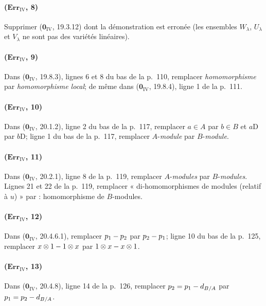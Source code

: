 \paragraph{($\mathbf{Err}_{\mathrm{IV}}$, 8)}
Supprimer ($\mathbf{0}_{\mathrm{IV}}$, 19.3.12) dont la démonstration est erronée
(les ensembles $W_\lambda$, $U_\lambda$ et $V_\lambda$ ne sont pas des
variétés linéaires).

\paragraph{($\mathbf{Err}_{\mathrm{IV}}$, 9)}
Dans ($\mathbf{0}_{\mathrm{IV}}$, 19.8.3), lignes 6 et 8 du bas de la p.~110,
remplacer \emph{homomorphisme} par \emph{homomorphisme local}; de même dans
($\mathbf{0}_{\mathrm{IV}}$, 19.8.4), ligne 1 de la p.~111.

\paragraph{($\mathbf{Err}_{\mathrm{IV}}$, 10)}
Dans ($\mathbf{0}_{\mathrm{IV}}$, 20.1.2), ligne 2 du bas de la p.~117,
remplacer $a\in A$ par $b\in B$ et $a\mathrm{D}$ par $b\mathrm{D}$; ligne 1 du bas de la
p.~117, remplacer $A$-\emph{module} par $B$-\emph{module}.

\paragraph{($\mathbf{Err}_{\mathrm{IV}}$, 11)}
Dans ($\mathbf{0}_{\mathrm{IV}}$, 20.2.1), ligne 8 de la p.~119, remplacer
$A$-\emph{modules} par $B$-\emph{modules}. Lignes 21 et 22 de la p.~119, remplacer
« di-homomorphismes de modules (relatif à $u$) » par : homomorphisme
de $B$-modules.

\paragraph{($\mathbf{Err}_{\mathrm{IV}}$, 12)}
Dans ($\mathbf{0}_{\mathrm{IV}}$, 20.4.6.1), remplacer $p_1- p_2$ par $p_2- p_1$;
ligne 10 du bas de la p.~125, remplacer $x\otimes1- 1\otimes x$ par
$1\otimes x- x\otimes1$.

\paragraph{($\mathbf{Err}_{\mathrm{IV}}$, 13)}
Dans ($\mathbf{0}_{\mathrm{IV}}$, 20.4.8), ligne 14 de la p.~126, remplacer
$p_2=p_1- d_{B/A}$ par $p_1=p_2- d_{B/A}$.

